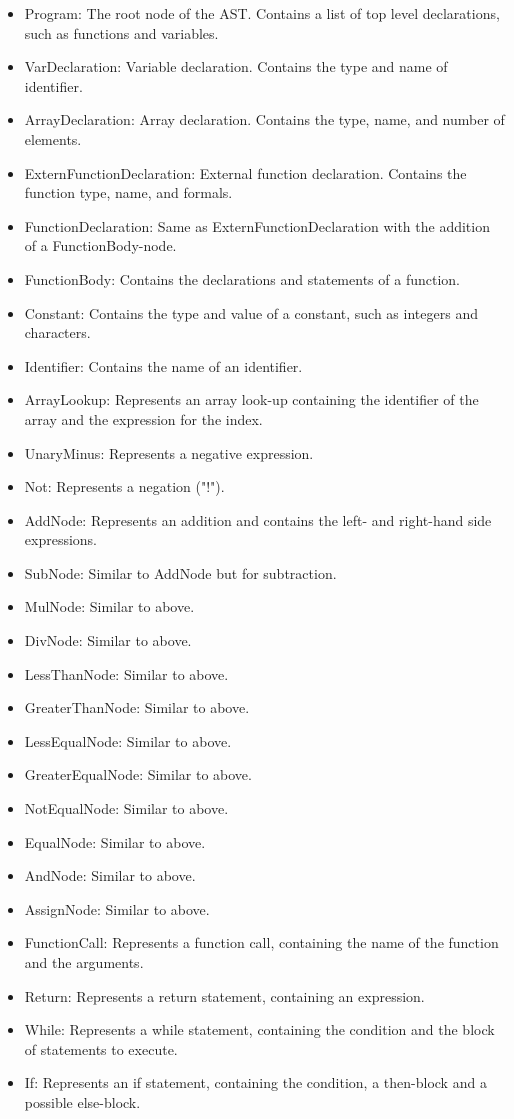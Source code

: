 \begin{itemize}
\item Program: The root node of the AST. Contains a list of top level declarations, such as functions and variables.
\item VarDeclaration: Variable declaration. Contains the type and name of identifier.
\item ArrayDeclaration: Array declaration. Contains the type, name, and number of elements.
\item ExternFunctionDeclaration: External function declaration. Contains the function type, name, and formals.
\item FunctionDeclaration: Same as ExternFunctionDeclaration with the addition of a FunctionBody-node.
\item FunctionBody: Contains the declarations and statements of a function.
\item Constant: Contains the type and value of a constant, such as integers and characters.
\item Identifier: Contains the name of an identifier.
\item ArrayLookup: Represents an array look-up containing the identifier of the array and the expression for the index.
\item UnaryMinus: Represents a negative expression.
\item Not: Represents a negation ("!").
\item AddNode: Represents an addition and contains the left- and right-hand side expressions.
\item SubNode: Similar to AddNode but for subtraction.
\item MulNode: Similar to above.
\item DivNode: Similar to above.
\item LessThanNode: Similar to above.
\item GreaterThanNode: Similar to above.
\item LessEqualNode: Similar to above.
\item GreaterEqualNode: Similar to above.
\item NotEqualNode: Similar to above.
\item EqualNode: Similar to above.
\item AndNode: Similar to above.
\item AssignNode: Similar to above.
\item FunctionCall: Represents a function call, containing the name of the function and the arguments.
\item Return: Represents a return statement, containing an expression.
\item While: Represents a while statement, containing the condition and the block of statements to execute.
\item If: Represents an if statement, containing the condition, a then-block and a possible else-block.
\end{itemize}

